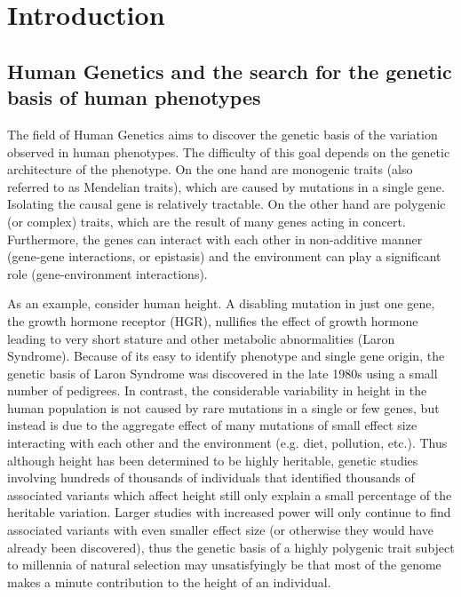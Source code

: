 \chapter{Introduction}

\section{Human Genetics and the search for the genetic basis of human phenotypes}

The field of Human Genetics aims to discover the genetic basis of the
variation observed in human phenotypes. The difficulty of this goal
depends on the genetic architecture of the phenotype. On the one hand
are monogenic traits (also referred to as Mendelian traits), which are
caused by mutations in a single gene. Isolating the causal gene is
relatively tractable. On the other hand are polygenic (or complex)
traits, which are the result of many genes acting in
concert. Furthermore, the genes can interact with each other in
non-additive manner (gene-gene interactions, or epistasis) and the
environment can play a significant role (gene-environment
interactions).

As an example, consider human height. A disabling mutation in just one
gene, the growth hormone receptor (HGR), nullifies the effect of
growth hormone leading to very short stature and other metabolic
abnormalities (Laron Syndrome). Because of its easy to identify
phenotype and single gene origin, the genetic basis of Laron Syndrome
was discovered in the late 1980s using a small number of pedigrees. In
contrast, the considerable variability in height in the human
population is not caused by rare mutations in a single or few genes,
but instead is due to the aggregate effect of many mutations of small
effect size interacting with each other and the environment
(e.g. diet, pollution, etc.). Thus although height has been determined
to be highly heritable, genetic studies involving hundreds of
thousands of individuals that identified thousands of associated
variants which affect height still only explain a small percentage of
the heritable variation. Larger studies with increased power will only
continue to find associated variants with even smaller effect size (or
otherwise they would have already been discovered), thus the genetic
basis of a highly polygenic trait subject to millennia of natural
selection may unsatisfyingly be that most of the genome makes a minute
contribution to the height of an individual.

